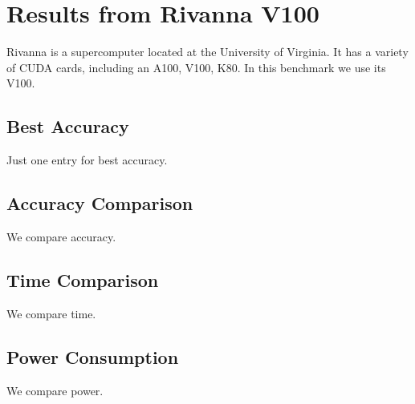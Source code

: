 \documentclass[11pt,twocolumn]{article}
\begin{document}
\section{Results from Rivanna V100}

Rivanna is a supercomputer located at the University
of Virginia. It has a variety of CUDA cards, including
an A100, V100, K80. In this benchmark we use its V100.

\subsection{Best Accuracy}

Just one entry for best accuracy.

\subsection{Accuracy Comparison}

We compare accuracy.

\subsection{Time Comparison}

We compare time.

\subsection{Power Consumption}

We compare power.
\end{document}
